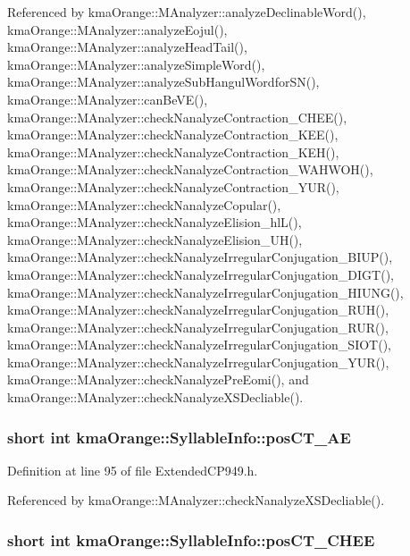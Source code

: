 Referenced by kmaOrange::MAnalyzer::analyzeDeclinableWord(), kmaOrange::MAnalyzer::analyzeEojul(), kmaOrange::MAnalyzer::analyzeHeadTail(), kmaOrange::MAnalyzer::analyzeSimpleWord(), kmaOrange::MAnalyzer::analyzeSubHangulWordforSN(), kmaOrange::MAnalyzer::canBeVE(), kmaOrange::MAnalyzer::checkNanalyzeContraction\_\-CHEE(), kmaOrange::MAnalyzer::checkNanalyzeContraction\_\-KEE(), kmaOrange::MAnalyzer::checkNanalyzeContraction\_\-KEH(), kmaOrange::MAnalyzer::checkNanalyzeContraction\_\-WAHWOH(), kmaOrange::MAnalyzer::checkNanalyzeContraction\_\-YUR(), kmaOrange::MAnalyzer::checkNanalyzeCopular(), kmaOrange::MAnalyzer::checkNanalyzeElision\_\-hlL(), kmaOrange::MAnalyzer::checkNanalyzeElision\_\-UH(), kmaOrange::MAnalyzer::checkNanalyzeIrregularConjugation\_\-BIUP(), kmaOrange::MAnalyzer::checkNanalyzeIrregularConjugation\_\-DIGT(), kmaOrange::MAnalyzer::checkNanalyzeIrregularConjugation\_\-HIUNG(), kmaOrange::MAnalyzer::checkNanalyzeIrregularConjugation\_\-RUH(), kmaOrange::MAnalyzer::checkNanalyzeIrregularConjugation\_\-RUR(), kmaOrange::MAnalyzer::checkNanalyzeIrregularConjugation\_\-SIOT(), kmaOrange::MAnalyzer::checkNanalyzeIrregularConjugation\_\-YUR(), kmaOrange::MAnalyzer::checkNanalyzePreEomi(), and kmaOrange::MAnalyzer::checkNanalyzeXSDecliable().\hypertarget{structkmaOrange_1_1SyllableInfo_b1a07bfdd0b87150fcc77c0c3be19d20}{
\subsubsection[{posCT\_\-AE}]{\setlength{\rightskip}{0pt plus 5cm}short int {\bf kmaOrange::SyllableInfo::posCT\_\-AE}}}
\label{structkmaOrange_1_1SyllableInfo_b1a07bfdd0b87150fcc77c0c3be19d20}




Definition at line 95 of file ExtendedCP949.h.

Referenced by kmaOrange::MAnalyzer::checkNanalyzeXSDecliable().\hypertarget{structkmaOrange_1_1SyllableInfo_90e6225b5393254a9195f4dd41890625}{
\subsubsection[{posCT\_\-CHEE}]{\setlength{\rightskip}{0pt plus 5cm}short int {\bf kmaOrange::SyllableInfo::posCT\_\-CHEE}}}
\label{structkmaOrange_1_1SyllableInfo_90e6225b5393254a9195f4dd41890625}





